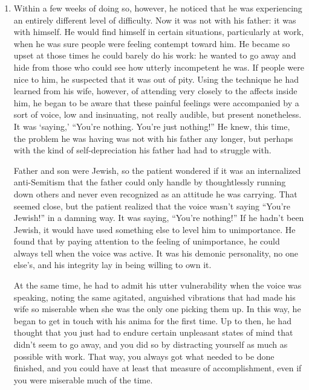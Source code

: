 \begin{enumerate}
\item {} Within a few
weeks of doing so, however, he noticed that he was experiencing an entirely
different level of difficulty. Now it was not with his father: it was with
himself. He would find himself in certain situations, particularly at work,
when he was sure people were feeling contempt toward him. He became so upset at
those times he could barely do his work: he wanted to go away and hide from
those who could see how utterly incompetent he was. If people were nice to him,
he suspected that it was out of pity. Using the technique he had learned from
his wife, however, of attending very closely to the affects inside him, he
began to be aware that these painful feelings were accompanied by a sort of
voice, low and insinuating, not really audible, but present nonetheless. It was
‘saying,’ “You’re nothing. You’re just nothing!” He knew, this time, the
problem he was having was not with his father any longer, but perhaps with the
kind of self-depreciation his father had had to struggle with.

Father and son were Jewish, so the patient wondered if it was an internalized
anti-Semitism that the father could only handle by thoughtlessly running down
others and never even recognized as an attitude he was carrying. That seemed
close, but the patient realized that the voice wasn’t saying “You’re Jewish!”
in a damning way. It was saying, “You’re nothing!” If he hadn’t been Jewish, it
would have used something else to level him to unimportance. He found that by
paying attention to the feeling of unimportance, he could always tell when the
voice was active. It was his demonic personality, no one else’s, and his
integrity lay in being willing to own it.

At the same time, he had to admit his utter vulnerability when the voice was
speaking, noting the same agitated, anguished vibrations that had made his wife
so miserable when she was the only one picking them up. In this way, he began
to get in touch with his anima for the first time. Up to then, he had thought
that you just had to endure certain unpleasant states of mind that didn’t seem
to go away, and you did so by distracting yourself as much as possible with
work. That way, you always got what needed to be done finished, and you could
have at least that measure of accomplishment, even if you were miserable much
of the time.


\end{enumerate}
